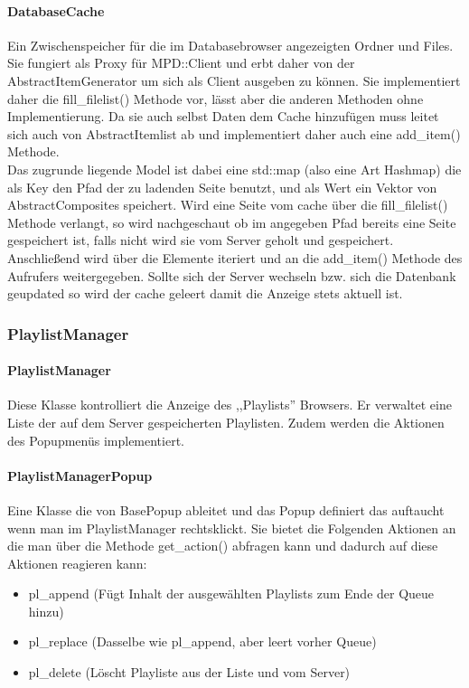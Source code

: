 \paragraph{DatabaseCache}
Ein Zwischenspeicher für die im Databasebrowser angezeigten Ordner und Files. 
Sie fungiert als Proxy für MPD::Client und erbt daher von der AbstractItemGenerator um sich als Client ausgeben zu können.
Sie implementiert daher die fill\_filelist() Methode vor, lässt aber die anderen Methoden ohne Implementierung.
Da sie auch selbst Daten dem Cache hinzufügen muss leitet sich auch von AbstractItemlist ab und implementiert daher auch eine add\_item() Methode. 
\\
Das zugrunde liegende Model ist dabei eine std::map (also eine Art Hashmap) die als Key den Pfad der zu ladenden Seite benutzt,
und als Wert ein Vektor von AbstractComposites speichert. Wird eine Seite vom cache über die fill\_filelist() Methode verlangt,
so wird nachgeschaut ob im angegeben Pfad bereits eine Seite gespeichert ist, falls nicht wird sie vom Server geholt und gespeichert. 
Anschließend wird über die Elemente iteriert und an die add\_item() Methode des Aufrufers weitergegeben.
Sollte sich der Server wechseln bzw. sich die Datenbank geupdated so wird der cache geleert damit die Anzeige stets aktuell ist.


\subsubsection{PlaylistManager}
\paragraph{PlaylistManager}
Diese Klasse kontrolliert die Anzeige des ,,Playlists'' Browsers. Er verwaltet eine Liste der auf dem Server gespeicherten Playlisten.
Zudem werden die Aktionen des Popupmenüs implementiert.

\paragraph{PlaylistManagerPopup}
Eine Klasse die von BasePopup ableitet und das Popup definiert das auftaucht wenn man im PlaylistManager rechtsklickt.
Sie bietet die Folgenden Aktionen an die man über die Methode get\_action() abfragen kann und dadurch auf diese Aktionen reagieren kann:
\begin{itemize}
\item pl\_append (Fügt Inhalt der ausgewählten Playlists zum Ende der Queue hinzu)
\item pl\_replace (Dasselbe wie pl\_append, aber leert vorher Queue)
\item pl\_delete (Löscht Playliste aus der Liste und vom Server)
\end{itemize}

